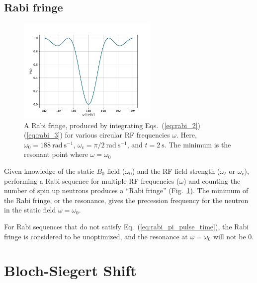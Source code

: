 
\subsection{Rabi fringe}\label{sec:rabi_fringe}


\begin{figure}
    \centering
    \includegraphics[width=0.6\textwidth]{figures/rabi_circ.pdf}
    \caption{A Rabi fringe, produced by integrating Eqs.~(\ref{eq:rabi_2})\textendash (\ref{eq:rabi_3}) for various circular RF frequencies $\omega$. Here, $\omega_0=\qty{188}{\radian\ \s^{-1}}$, $\omega_\text{c}=\pi/\qty{2}{\radian\ \s^{-1}}$, and $t=\qty{2}{\s}$. The minimum is the resonant point where $\omega=\omega_0$}
    \label{fig:rabi_fringe_circ}
\end{figure}

Given knowledge of the static $B_0$ field ($\omega_0$) and the RF field strength ($\omega_\ell\text{ or }\omega_\text{c}$), performing a Rabi sequence for multiple RF frequencies ($\omega$) and counting the number of spin up neutrons produces a ``Rabi fringe'' (Fig.~\ref{fig:rabi_fringe_circ}). The minimum of the Rabi fringe, or the resonance, gives the precession frequency for the neutron in the static field $\omega=\omega_0$. 

For Rabi sequences that do not satisfy Eq.~(\ref{eq:rabi_pi_pulse_time}), the Rabi fringe is considered to be unoptimized, and the resonance at $\omega=\omega_0$ will not be 0.



\section{Bloch-Siegert Shift}\label{sec:bloch-siegert}

